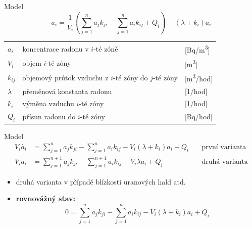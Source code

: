 \documentclass[10pt]{beamer}
\begin{document}
\begin{frame}{Model}
    \small
    \begin{equation}
        \dot{a_i}=\frac{1}{V_i}\left( \sum^n_{j=1}a_j k_{ji}-\sum^n_{j=1}a_i k_{ij}+Q_i \right)-(\lambda+k_i)a_i
        \label{eq:odvozovani}
    \end{equation}
    \begin{table}
        \centering
        \begin{tabular}{lll}
            $a_i$ & koncentrace radonu v $i$-té zóně& [\si{Bq/m^3}] \\
            $V_i$ & objem $i$-té zóny& [\si{m^3}] \\
            $k_{ij}$ & objemový průtok vzduchu z $i$-té zóny do $j$-té zóny& [\si{m^3/hod}]\\
            $\lambda$ & přeměnová konstanta radonu& [\si{1/hod}]\\
            $k_i$ & výměna vzduchu $i$-té zóny& [\si{1/hod}] \\
            $Q_i$ & přísun radonu do $i$-té zóny& [\si{Bq/hod}] \\
        \end{tabular}
    \end{table}
\end{frame}

\begin{frame}{Model}
    \small
    \begin{align}
        V_i\dot{a_i}&=\sum^n_{j=1}a_j k_{ji}-\sum^n_{j=1}a_i k_{ij}-V_i(\lambda+k_i)a_i+Q_i\quad&\text{první varianta}\\
        V_i\dot{a_i}&=\sum^{n+1}_{j=1}a_j k_{ji}-\sum^{n+1}_{j=1}a_i k_{ij}-V_i\lambda a_i+Q_i\quad&\text{druhá varianta}
        \label{eq:rovnice}
    \end{align}
    \begin{itemize}
        \item druhá varianta v případě blízkosti uranových hald atd.
        \item \textbf{rovnovážný stav:}
            \begin{equation}
                0=\sum^n_{j=1}a_j k_{ji}-\sum^n_{j=1}a_i k_{ij}-V_i(\lambda+k_i)a_i+Q_i
            \end{equation}
    \end{itemize}
\end{frame}
\end{document}
